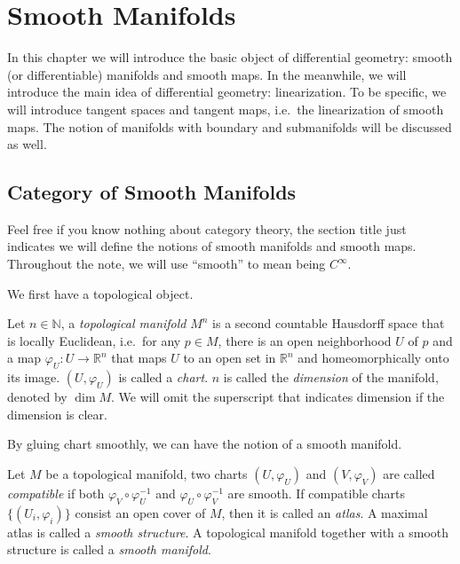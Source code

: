 \chapter{Smooth Manifolds}

In this chapter we will introduce the basic object of differential geometry: smooth (or differentiable) manifolds and smooth maps.
In the meanwhile, we will introduce the main idea of differential geometry: linearization.
To be specific, we will introduce tangent spaces and tangent maps, i.e.\ the linearization of smooth maps.
The notion of manifolds with boundary and submanifolds will be discussed as well.

\section{Category of Smooth Manifolds}

Feel free if you know nothing about category theory, the section title just indicates we will define the notions of smooth manifolds and smooth maps.
Throughout the note, we will use ``smooth'' to mean being $C^\infty$.

We first have a topological object.
\begin{defn}
    Let $n\in\mathbb{N}$, a \emph{topological manifold} $M^n$ is a second countable Hausdorff space that is locally Euclidean, i.e.\ for any $p\in M$, there is an open neighborhood $U$ of $p$ and a map $\varphi_U:U\to\mathbb{R}^n$ that maps $U$ to an open set in $\mathbb{R}^n$ and homeomorphically onto its image.
    $(U,\varphi_U)$ is called a \emph{chart}.
    $n$ is called the \emph{dimension} of the manifold, denoted by $\dim{M}$.
    We will omit the superscript that indicates dimension if the dimension is clear.
\end{defn}

By gluing chart smoothly, we can have the notion of a smooth manifold.
\begin{defn}
    Let $M$ be a topological manifold, two charts $(U,\varphi_U)$ and $(V,\varphi_V)$ are called \emph{compatible} if both $\varphi_V\circ\varphi_U^{-1}$ and $\varphi_U\circ\varphi_V^{-1}$ are smooth.
    If compatible charts $\{(U_i,\varphi_i)\}$ consist an open cover of $M$, then it is called an \emph{atlas}.
    A maximal atlas is called a \emph{smooth structure}.
    A topological manifold together with a smooth structure is called a \emph{smooth manifold}.
\end{defn}

